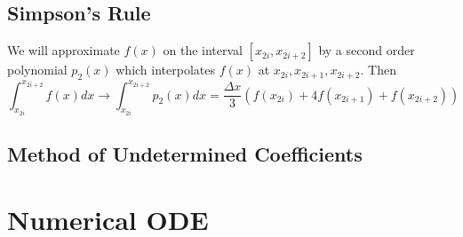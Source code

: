 \documentclass[12pt]{article}
\theoremstyle{definition}
\theoremstyle{definition}
\begin{document}
\subsection{Simpson's Rule}
We will approximate $f(x)$ on the interval $[x_{2i},x_{2i+2}]$ by a second order polynomial $p_2(x)$ which interpolates $f(x)$ at $x_{2i}, x_{2i+1}, x_{2i+2}$. Then
\begin{equation}
	\int_{x_{2i}}^{x_{2i+2}}  f(x)dx \to \int_{x_{2i}}^{x_{2i+2}}p_2(x) dx = \frac{\Delta x}{3}(f(x_{2i}) + 4f(x_{2i+1}) + f(x_{2i+2}))
\end{equation}

\subsection{Method of Undetermined Coefficients}


\section{Numerical ODE}
\end{document}
